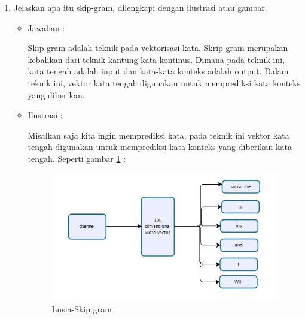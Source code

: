 \begin{enumerate}
\begin{itemize}
	\end{itemize}

\item Jelaskan apa itu skip-gram, dilengkapi dengan ilustrasi atau gambar.
	\begin{itemize}
	\item Jawaban :
		\par Skip-gram adalah teknik pada vektorisasi kata. Skrip-gram merupakan kebalikan dari teknik kantung kata kontinus. Dimana pada teknik ini, kata tengah adalah input dan kata-kata konteks adalah output. Dalam teknik ini, vektor kata tengah digunakan untuk memprediksi kata konteks yang diberikan. 

	\item Ilustrasi :
		\par Misalkan saja kita ingin memprediksi kata, pada teknik ini vektor kata tengah digunakan untuk memprediksi kata konteks yang diberikan kata tengah. Seperti gambar \ref{5a8} : 
			\begin{figure}[!hbtp]
			\centering
			\includegraphics[scale=0.5]{figures/p6.jpg}
			\caption{Lusia-Skip gram}
			\label{5a8}
			\end{figure}
	
	\end{itemize}

\end{enumerate}

